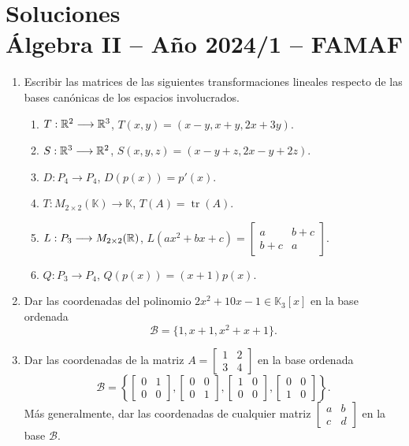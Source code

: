 \chapter{Soluciones\\Álgebra  II -- Año 2024/1 -- FAMAF}\label{practico-8}

\begin{enumerate}[topsep=6pt, itemsep=.4cm]

\item \label{lineales1-bases} Escribir las matrices de las siguientes transformaciones lineales respecto de las bases canónicas de los espacios involucrados.

\begin{enumerate}
    \item\label{lineales1-bases-a} $T:\mathbb R^2 \longrightarrow \mathbb R^3$, $T(x,y)=(x-y,x+y,2x+3y)$.
    \item\label{lineales1-bases-b} $S:\mathbb R^3 \longrightarrow \mathbb R^2$, $S(x,y,z)=(x-y+z,2x-y+2z)$.
    \item\label{lineales1-base-c} $D:P_4  \longrightarrow P_4$, $D(p(x))=p'(x)$.
    \item $T:M_{2\times 2}(\mathbb{K}) \longrightarrow \mathbb{K}$, $T(A)=\operatorname{tr}(A)$.
    \item\label{lineales1-base-d} $L:P_3 \longrightarrow M_{2\times 2}(\mathbb R)$, $L(ax^2+bx+c)=\begin{bmatrix} a & b+c \\ b+c & a \end{bmatrix}$.
    \item\label{lineales1-base-e} $Q:P_3 \longrightarrow P_4$, $Q(p(x))=(x+1)p(x)$.
\end{enumerate}

\item Dar las coordenadas del polinomio $2x^2+10x-1\in\mathbb{K}_3[x]$ en la base ordenada $$\mathcal{B}=\{1,x+1,x^2+x+1\}.$$

\item Dar las coordenadas de la matriz 
$A=\begin{bmatrix}
    1&2\\3&4 
    \end{bmatrix}
$ en la base ordenada 
$$
\mathcal{B}=\left\{
\begin{bmatrix}
    0&1\\0&0 
    \end{bmatrix},
\begin{bmatrix}
    0&0\\0&1 
    \end{bmatrix},
    \begin{bmatrix}
    1&0\\0&0 
    \end{bmatrix},
    \begin{bmatrix}
    0&0\\1&0 
    \end{bmatrix}
\right\}.
$$
Más generalmente, dar las coordenadas de cualquier matriz $\begin{bmatrix}
    a&b\\c&d 
    \end{bmatrix}$ en la base $\mathcal{B}$.



\end{enumerate}
